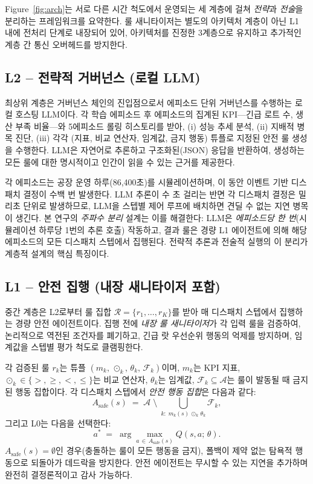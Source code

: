 \documentclass[10pt]{article}
\begin{document}
Figure~\ref{fig:arch}는 서로 다른 시간 척도에서 운영되는 세 계층에 걸쳐
\emph{전략}과 \emph{전술}을 분리하는 프레임워크를 요약한다. 룰 새니타이저는
별도의 아키텍처 계층이 아닌 L1 내에 전처리 단계로 내장되어 있어, 아키텍처를
진정한 3계층으로 유지하고 추가적인 계층 간 통신 오버헤드를 방지한다.

\subsection{L2 -- 전략적 거버넌스 (로컬 LLM)}
최상위 계층은 거버넌스 체인의 진입점으로서 에피소드 단위 거버넌스를 수행하는
로컬 호스팅 LLM이다. 각 학습 에피소드 후 에피소드의 집계된 KPI---긴급 로트 수,
생산 부족 비율---와 5에피소드 롤링 히스토리를 받아,
(i) 성능 추세 분석, (ii) 지배적 병목 진단, (iii) 각각 (지표, 비교 연산자,
임계값, 금지 행동) 튜플로 지정된 안전 룰 생성을 수행한다. LLM은 자연어로
추론하고 구조화된(JSON) 응답을 반환하여, 생성하는 모든 룰에 대한 명시적이고
인간이 읽을 수 있는 근거를 제공한다.

각 에피소드는 공장 운영 하루(86,400초)를 시뮬레이션하며, 이 동안 이벤트 기반
디스패치 결정이 수백 번 발생한다. LLM 추론이 수 초 걸리는 반면 각 디스패치
결정은 밀리초 단위로 발생하므로, LLM을 스텝별 제어 루프에 배치하면 견딜 수 없는
지연 병목이 생긴다. 본 연구의 \emph{주파수 분리} 설계는 이를 해결한다: LLM은
\emph{에피소드당 한 번}(시뮬레이션 하루당 1번의 추론 호출) 작동하고, 결과 룰은
경량 L1 에이전트에 의해 해당 에피소드의 모든 디스패치 스텝에서 집행된다.
전략적 추론과 전술적 실행의 이 분리가 계층적 설계의 핵심 특징이다.

\subsection{L1 -- 안전 집행 (내장 새니타이저 포함)}
중간 계층은 L2로부터 룰 집합 $\mathcal{R} = \{r_1, \ldots, r_K\}$를 받아 매
디스패치 스텝에서 집행하는 경량 안전 에이전트이다. 집행 전에 \emph{내장 룰
새니타이저}가 각 입력 룰을 검증하여, 논리적으로 역전된 조건자를 폐기하고,
긴급 랏 우선순위 행동의 억제를 방지하며, 임계값을 스텝별 평가 척도로 클램핑한다.

각 검증된 룰 $r_k$는 튜플 $(m_k,\, \odot_k,\, \theta_k,\, \mathcal{F}_k)$이며,
$m_k$는 KPI 지표, $\odot_k \in \{>, \geq, <, \leq\}$는 비교 연산자, $\theta_k$는
임계값, $\mathcal{F}_k \subseteq \mathcal{A}$는 룰이 발동될 때 금지된 행동 집합이다.
각 디스패치 스텝에서 \emph{안전 행동 집합}은 다음과 같다:
\begin{equation}
  A_{\text{safe}}(s) \;=\; \mathcal{A} \;\setminus\;
  \bigcup_{k:\; m_k(s)\,\odot_k\,\theta_k} \mathcal{F}_k,
  \label{eq:mask}
\end{equation}
그리고 L0는 다음을 선택한다:
\begin{equation}
  a^* \;=\; \arg\max_{a \,\in\, A_{\text{safe}}(s)} Q(s, a;\,\theta).
  \label{eq:constrained}
\end{equation}
$A_{\text{safe}}(s) = \emptyset$인 경우(충돌하는 룰이 모든 행동을 금지),
폴백이 제약 없는 탐욕적 행동으로 되돌아가 데드락을 방지한다.
안전 에이전트는 무시할 수 있는 지연을 추가하며 완전히 결정론적이고 감사 가능하다.
\end{document}
